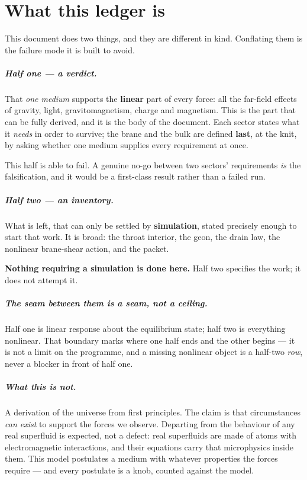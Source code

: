 \chapter*{What this ledger is}

This document does two things, and they are different in kind. Conflating them
is the failure mode it is built to avoid.

\paragraph{Half one --- a verdict.}
That \emph{one medium} supports the \textbf{linear} part of every force: all the
far-field effects of gravity, light, gravitomagnetism, charge and magnetism.
This is the part that can be fully derived, and it is the body of the document.
Each sector states what it \emph{needs} in order to survive; the brane and the
bulk are defined \textbf{last}, at the knit, by asking whether one medium
supplies every requirement at once.

This half is able to fail. A genuine no-go between two sectors' requirements
\emph{is} the falsification, and it would be a first-class result rather than a
failed run.

\paragraph{Half two --- an inventory.}
What is left, that can only be settled by \textbf{simulation}, stated precisely
enough to start that work. It is broad: the throat interior, the geon, the drain
law, the nonlinear brane-shear action, and the packet.

\textbf{Nothing requiring a simulation is done here.} Half two specifies the
work; it does not attempt it.

\paragraph{The seam between them is a seam, not a ceiling.}
Half one is linear response about the equilibrium state; half two is everything
nonlinear. That boundary marks where one half ends and the other begins --- it
is not a limit on the programme, and a missing nonlinear object is a half-two
\emph{row}, never a blocker in front of half one.

\paragraph{What this is not.}
A derivation of the universe from first principles. The claim is that
circumstances \emph{can exist} to support the forces we observe. Departing from
the behaviour of any real superfluid is expected, not a defect: real superfluids
are made of atoms with electromagnetic interactions, and their equations carry
that microphysics inside them. This model postulates a medium with whatever
properties the forces require --- and every postulate is a knob, counted against
the model.
